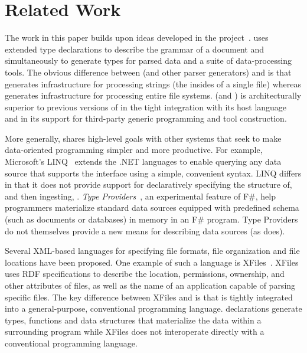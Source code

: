 \section{Related Work}
\label{sec:related}

The work in this paper builds upon ideas developed in the \pads{} 
project~\cite{fisher+:pads,fisher+:toplas}. \pads{} uses extended
type declarations to describe the grammar of a document
and simultaneously to generate types for parsed data and a suite 
of data-processing tools.  The obvious difference between 
\pads{} (and other parser generators) and
\forest{} is that 
\pads{} generates infrastructure for processing strings (the insides
of a single file) whereas \forest{} generates infrastructure for 
processing entire file systems.
\forest{} (and \padshaskell) is architecturally superior to 
previous versions of \pads{} in the tight integration with its host
language and
in its support for third-party generic programming and tool construction.

More generally, \forest{} shares high-level goals with other systems
that seek to make data-oriented programming simpler and more productive.
For example, Microsoft's LINQ~\cite{linq} extends the .NET languages
to enable querying
any data source that supports the  interface using
a simple, convenient syntax.  
LINQ differs in that it does not provide support for
declaratively specifying the structure of, and then ingesting, 
\filestores{}. {\em Type Providers}~\cite{syme+:type-providers}, an
experimental feature 
of F\#, help programmers materialize standard data sources equipped with
predefined schema (such as \xml{} documents or databases) in memory in
an F\# program.  Type Providers
do not themselves provide a new means for describing data sources (as
\forest{} does). 

Several XML-based languages for specifying file formats, file
organization and file locations have been proposed. One example of
such a language is XFiles~\cite{xml-file-sys}.  XFiles uses RDF
specifications to describe the location, permissions, ownership, and
other attributes of files, as well as the name of an application
capable of parsing specific files.  The key difference between XFiles
and \forest{} is that \forest{} is tightly integrated into a
general-purpose, conventional programming language.  \forest{}
declarations generate types, functions and data structures that
materialize the data within a surrounding \haskell{} program while
XFiles does not interoperate directly with a conventional programming
language.

